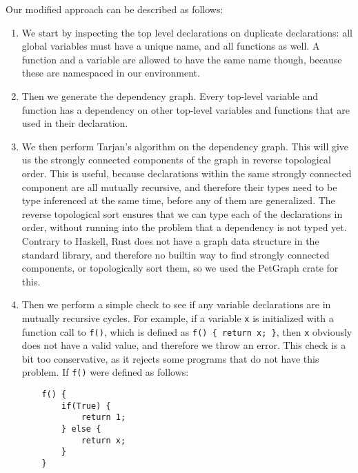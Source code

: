 Our modified approach can be described as follows:
\begin{enumerate}
    \item We start by inspecting the top level declarations on duplicate declarations: all global variables must have a unique name, and all functions as well. A function and a variable are allowed to have the same name though, because these are namespaced in our environment.
    \item Then we generate the dependency graph. Every top-level variable and function has a dependency on other top-level variables and functions that are used in their declaration.
    \item We then perform Tarjan's algorithm on the dependency graph. This will give us the strongly connected components of the graph in reverse topological order. This is useful, because declarations within the same strongly connected component are all mutually recursive, and therefore their types need to be type inferenced at the same time, before any of them are generalized. The reverse topological sort ensures that we can type each of the declarations in order, without running into the problem that a dependency is not typed yet. Contrary to Haskell, Rust does not have a graph data structure in the standard library, and therefore no builtin way to find strongly connected components, or topologically sort them, so we used the PetGraph crate \cite{petgraph} for this.
    \item Then we perform a simple check to see if any variable declarations are in mutually recursive cycles. For example, if a variable \lstinline|x| is initialized with a function call to \lstinline|f()|, which is defined as \lstinline|f() { return x; }|, then \lstinline|x| obviously does not have a valid value, and therefore we throw an error. This check is a bit too conservative, as it rejects some programs that do not have this problem. If \lstinline|f()| were defined as follows:
    
    \begin{lstlisting}
    f() {
        if(True) {
            return 1;
        } else {
            return x;
        }
    }
    \end{lstlisting}
    

\end{enumerate}
